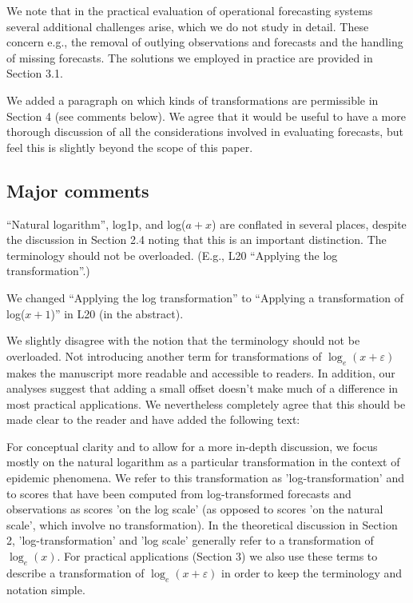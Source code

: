 \documentclass{article}
\newcommand{\black}{\color{black}}
\newcommand{\blue}{\color{blue}}
\newcommand{\indented}{\setlength{\leftskip}{1cm}}
\newcommand{\notindented}{\setlength{\leftskip}{0cm}}
\begin{document}
\indented
We note that in the practical evaluation of operational forecasting systems  several additional challenges arise, which we do not study in detail. These concern e.g., the removal of outlying observations and forecasts and the handling of missing forecasts. The solutions we employed in practice are provided in Section 3.1.
\notindented

We added a paragraph on which kinds of transformations are permissible in Section 4 (see comments below). We agree that it would be useful to have a more thorough discussion of all the considerations involved in evaluating forecasts, but feel this is slightly beyond the scope of this paper. 

\blue
\subsection{Major comments}

``Natural logarithm'', log1p, and log($a + x$) are conflated in several places, despite the discussion in Section 2.4 noting that this is an important distinction. The terminology should not be overloaded. (E.g., L20 ``Applying the log transformation''.)

\black
We changed ``Applying the log transformation'' to ``Applying a transformation of log($x + 1$)'' in L20 (in the abstract). 

We slightly disagree with the notion that the terminology should not be overloaded. Not introducing another term for transformations of $\log_{e}(x + \varepsilon)$ makes the manuscript more readable and accessible to readers. In addition, our analyses suggest that adding a small offset doesn't make much of a difference in most practical applications. We nevertheless completely agree that this should be made clear to the reader and have added the following text: 

\indented
For conceptual clarity and to allow for a more in-depth discussion, we focus mostly on the natural logarithm as a particular transformation in the context of epidemic phenomena. We refer to this transformation as 'log-transformation' and to scores that have been computed from log-transformed forecasts and observations as scores 'on the log scale' (as opposed to scores 'on the natural scale', which involve no transformation). In the theoretical discussion in Section 2, 'log-transformation' and 'log scale' generally refer to a transformation of $\log_{e}(x)$. For practical applications (Section 3) we also use these terms to describe a transformation of $\log_{e}(x + \varepsilon)$ in order to keep the terminology and notation simple.
\end{document}
